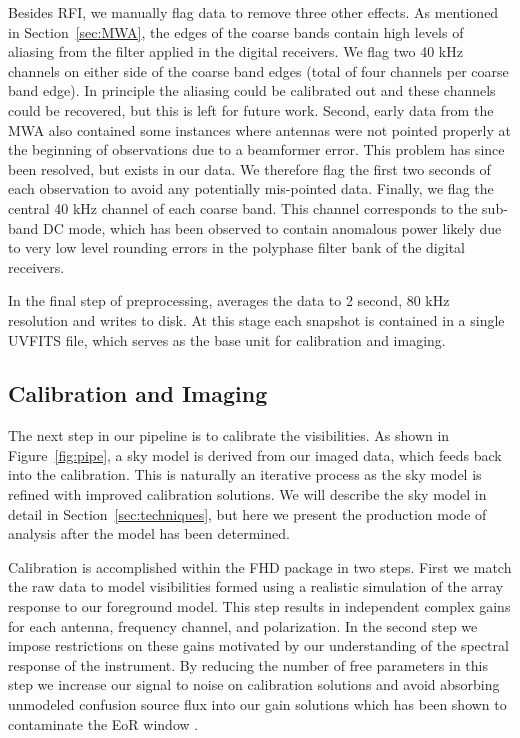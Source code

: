 \documentclass[iop]{emulateapj}
\begin{document}
Besides RFI, we manually flag data to remove three other effects. As mentioned in 
Section~\ref{sec:MWA}, the edges of the coarse bands contain high levels of aliasing from 
the filter applied in the digital receivers. We flag two 40 kHz channels on either side of the 
coarse band edges (total of four channels per coarse band edge). In principle the aliasing 
could be calibrated out and these channels could be recovered, but this is left for future 
work. Second, early data from the MWA also contained some instances where antennas 
were not pointed properly at the beginning of observations due to a beamformer error. This 
problem has since been resolved, but exists in our data. We therefore flag the first two 
seconds of each observation to avoid any potentially mis-pointed data. 
Finally, we flag the central 40 kHz channel of each coarse band. This channel corresponds
to the sub-band DC mode, which has been observed to contain anomalous power likely
due to very low level rounding errors in the polyphase filter bank of the digital receivers.

In the final step of preprocessing, \cotter averages the data to 2 second, 80 kHz resolution 
and writes to disk. At this stage each snapshot is contained in a single UVFITS file, which 
serves as the base unit for calibration and imaging.


\subsection{Calibration and Imaging}\label{subsec:cal_imaging}
The next step in our pipeline is to calibrate the visibilities. As shown in Figure~\ref{fig:pipe}, 
a sky model is derived from our imaged data, which feeds back into the calibration. This is 
naturally an iterative process as the sky model is refined with improved calibration 
solutions. We will describe the sky model in detail in Section~\ref{sec:techniques}, but here 
we present the production mode of analysis after the model has been determined.

Calibration is accomplished within the FHD package in two steps. First we match the raw 
data to model visibilities formed using a realistic simulation of the array response to our 
foreground model. This step results in independent complex gains for each antenna, 
frequency channel, and polarization. In the second step we impose restrictions on these 
gains motivated by our understanding of the spectral response of the instrument. By 
reducing the number of free parameters in this step we increase our signal to noise on 
calibration solutions and avoid absorbing unmodeled confusion source flux into our gain 
solutions which has been shown to contaminate the EoR window \citep{Barry:2016}. 
\end{document}
